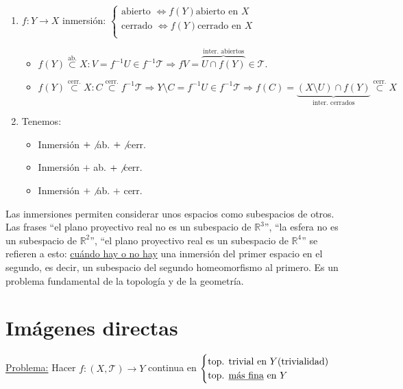\begin{obs}
\begin{enumerate}
    \item $f: Y \rightarrow X$ inmersión: $\begin{cases}
        \text{abierto } \Leftrightarrow f\left( Y \right) \text{abierto en } X\\
        \text{cerrado } \Leftrightarrow f\left( Y \right) \text{cerrado en } X\\
    \end{cases}$
    \begin{demo}
    \begin{itemize}
        \item 
        $f\left( Y \right) \stackrel{\text{ab.}}{\subset} X: V = f^{-1}U \in f^{-1}\mathcal{T} \Rightarrow fV = \overbrace{U \cap f\left( Y \right)}^{\text{inter. abiertos}} \in \mathcal{T}$.
        \item 
        $f\left( Y \right) \stackrel{\text{cerr.}}{\subset} X: C \stackrel{\text{cerr.}}{\subset}  f^{-1}\mathcal{T} \Rightarrow Y\setminus C = f^{-1} U \in f^{-1}\mathcal{T} \Rightarrow f\left( C \right) = \underbrace{\left( X\setminus U \right) \cap f\left( Y \right)}_{\text{inter. cerrados}}  \stackrel{\text{cerr.}}{\subset} X$ 
    \end{itemize} 
    \end{demo}

    \item Tenemos: 
    \begin{itemize}
        \item Inmersión $ + \not$ ab. $+ \not$ cerr.
        \item Inmersión $+$ ab. $+ \not $ cerr.
        \item Inmersión $+ \not$ ab. $+$ cerr.
    \end{itemize}
\end{enumerate}
\end{obs}

\begin{obs}
Las inmersiones permiten considerar unos espacios como subespacios de otros. Las frases ``el plano proyectivo real no es un subespacio de $\mathbb{R}^3$'', ``la esfera no es un subespacio de $\mathbb{R}^2$'', ``el plano proyectivo real es un subespacio de $\mathbb{R}^4$'' se refieren a esto: \underline{cuándo hay o no hay} una inmersión del primer espacio en el segundo, es decir, un subespacio del segundo homeomorfismo al primero. Es un problema fundamental de la topología
y de la geometría.
\end{obs}


\section{Imágenes directas}%
\label{sec:imagenes_directas}
\underline{Problema:} Hacer $f: \left( X, \mathcal{T} \right) \rightarrow Y$ continua en $\begin{cases}
    \text{top. trivial en } Y \text{(trivialidad)}\\
    \text{top. \underline{más fina} en } Y 
\end{cases} $ 

